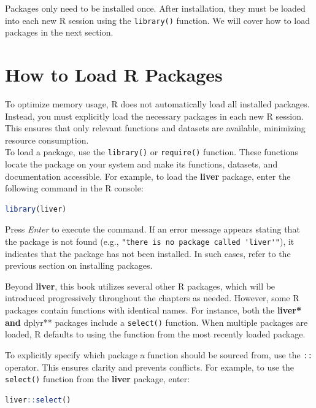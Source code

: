 \documentclass[
  11pt,
]{book}
\newcommand{\passthrough}[1]{#1}
\theoremstyle{definition}
\theoremstyle{definition}
\theoremstyle{definition}
\theoremstyle{definition}
\theoremstyle{remark}
\begin{document}
Packages only need to be installed once. After installation, they must be loaded into each new R session using the \passthrough{\lstinline!library()!} function. We will cover how to load packages in the next section.

\section{How to Load R Packages}\label{how-to-load-r-packages}

To optimize memory usage, R does not automatically load all installed packages. Instead, you must explicitly load the necessary packages in each new R session. This ensures that only relevant functions and datasets are available, minimizing resource consumption.\\
To load a package, use the \passthrough{\lstinline!library()!} or \passthrough{\lstinline!require()!} function. These functions locate the package on your system and make its functions, datasets, and documentation accessible. For example, to load the \textbf{liver} package, enter the following command in the R console:

\begin{lstlisting}[language=R]
library(liver)
\end{lstlisting}

Press \emph{Enter} to execute the command. If an error message appears stating that the package is not found (e.g., \passthrough{\lstinline!"there is no package called 'liver'"!}), it indicates that the package has not been installed. In such cases, refer to the previous section on installing packages.

Beyond \textbf{liver}, this book utilizes several other R packages, which will be introduced progressively throughout the chapters as needed. However, some R packages contain functions with identical names. For instance, both the \textbf{liver* and }dplyr** packages include a \passthrough{\lstinline!select()!} function. When multiple packages are loaded, R defaults to using the function from the most recently loaded package.

To explicitly specify which package a function should be sourced from, use the \passthrough{\lstinline!::!} operator. This ensures clarity and prevents conflicts. For example, to use the \passthrough{\lstinline!select()!} function from the \textbf{liver} package, enter:

\begin{lstlisting}[language=R]
liver::select()
\end{lstlisting}
\end{document}
